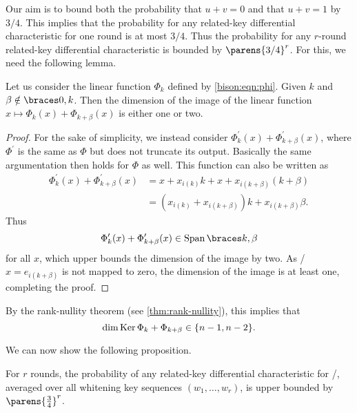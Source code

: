 Our aim is to bound both the probability that $u+v=0$ and that $u+v=1$ by $3/4$.
This implies that the probability for any related-key differential characteristic for one round is at most $3/4$.
Thus the probability for any $r$-round related-key differential characteristic is bounded by $\parens{3/4}^r$.
For this, we need the following lemma.
\begin{lemma}
\label{bison:lem:rank_phi}
    Let us consider the linear function $\Phi_k$ defined by \cref{bison:eqn:phi}.
    Given $k$ and $\beta \notin \set{0,k}$.
    Then the dimension of the image of the linear function $x \mapsto \Phi_k(x) + \Phi_{k+\beta}(x)$ is either one or two.
\end{lemma}
\begin{proof}
    For the sake of simplicity, we instead consider $\Phi^\prime_k(x) + \Phi^\prime_{k+\beta}(x)$, where $\Phi^\prime$ is the same as $\Phi$ but does not truncate its output.
    Basically the same argumentation then holds for $\Phi$ as well.
    This function can also be written as
    \begin{align*}
        \Phi^\prime_k(x) + \Phi^\prime_{k+\beta}(x)
        &= x + x_{i(k)}k + x + x_{i(k+\beta)}(k+\beta) \\
        &= (x_{i(k)} + x_{i(k+\beta)})k + x_{i(k+\beta)}\beta.
    \end{align*}
    Thus
    \begin{equation*}
        \Phi^\prime_k(x) + \Phi^\prime_{k+\beta}(x) \in \Span{k, \beta}
    \end{equation*}
    for all $x$, which upper bounds the dimension of the image by two.
    As \eg/ $x=e_{i(k+\beta)}$ is not mapped to zero, the dimension of the image is at least one, completing the proof.
\end{proof}
By the rank-nullity theorem (see \cref{thm:rank-nullity}), this implies that
\begin{equation*}
    \dim {\operatorname{Ker}{\Phi_k + \Phi_{k+\beta}}} \in \{n-1,n-2\}.
\end{equation*}

We can now show the following proposition.

\begin{proposition}\label{bison:prop:rk}
    For $r$ rounds, the probability of any related-key differential characteristic for \bison/, averaged over all whitening key sequences $(w_1, \ldots, w_r)$, is upper bounded by $\parens{\frac{3}{4}}^r$.
\end{proposition}

